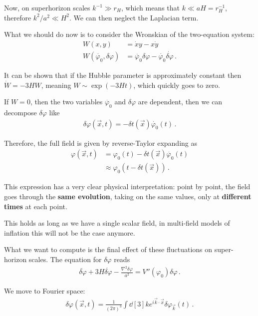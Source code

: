 \documentclass[main.tex]{subfiles}
\begin{document}
Now, on superhorizon scales \(k^{-1} \gg r_H\), which means that \(k \ll aH = r_H^{-1}\), therefore \(k^2 / a^2 \ll H^2\). 
We can then neglect the Laplacian term. 

What we should do now is to consider the Wronskian of the two-equation system:
%
\begin{align}
W (x, y) &= \dot{x} y - x \dot{y}  \\
W(\dot{\varphi_0}, \delta \varphi ) &= \ddot{\varphi_0} \delta \varphi - \dot{\varphi_0} \dot{ \delta \varphi}
\,.
\end{align}

It can be shown that if the Hubble parameter is approximately constant then \(\dot{W} = - 3 HW\), meaning \(W \sim \exp(- 3 H t)\), which quickly goes to zero.

If \(W = 0\), then the two variables \(\dot{\varphi_0} \) and \(\delta \varphi \) are dependent, then we can decompose \(\delta \varphi \) like 
%
\begin{align}
\delta \varphi (\vec{x}, t) = - \delta t (\vec{x}) \dot{\varphi_0}(t)
\,.
\end{align}

Therefore, the full field is given by reverse-Taylor expanding as 
%
\begin{align}
\varphi (\vec{x}, t) &= \varphi_0 (t) - \delta t(\vec{x}) \dot{\varphi_0}(t)  \\
&\approx \varphi_0 (t - \delta t(\vec{x}))
\,.
\end{align}

This expression has a very clear physical interpretation: point by point, the field goes through the \textbf{same evolution}, taking on the same values, only at \textbf{different times} at each point. 

This holds as long as we have a single scalar field, in multi-field models of inflation this will not be the case anymore. 

What we want to compute is the final effect of these fluctuations on super-horizon scales. 
The equation for \(\delta \varphi \) reads 
%
\begin{align}
\ddot{ \delta \varphi} + 3 H \dot{ \delta \varphi} 
- \frac{\nabla^2 \delta \varphi }{a^2} = V''(\varphi_0 ) \delta \varphi 
\,.
\end{align}

We move to Fourier space: 
%
\begin{align}
\delta \varphi (\vec{x}, t) = \frac{1}{(2\pi )^{3}} \int \dd[3]{k} 
e^{i \vec{k} \cdot \vec{x}} \delta \varphi _{\vec{k}}(t)
\,.
\end{align}
\end{document}
